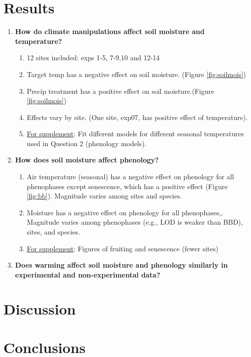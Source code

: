 \documentclass{article}
\begin{document}
\section* {Results}
\begin{singlespace}

\begin{enumerate}
\item {\textbf{How do climate manipulations affect soil moisture and temperature?}}
\begin{enumerate}
\item{12 sites included: exps 1-5, 7-9,10 and 12-14}
\item{Target temp has a negative effect on soil moisture. (Figure \ref {fig:soilmois})}
\item{Precip treatment has a positive effect on soil moisture.(Figure \ref {fig:soilmois})}
\item{Effects vary by site. (One site, exp07, has positive effect of temperature).}
\item \underline{For supplement}: Fit different models for different seasonal temperatures used in Question 2 (phenology models).
\end{enumerate}

\item{\textbf{How does soil moisture affect phenology?
}}
\begin{enumerate}
\item Air temperature (seasonal) has a negative effect on phenology for all phenophases except senescence, which has a positive effect (Figure \ref{fig:bb}). Magnitude varies among sites and species. 
\item Moisture has a negative effect on phenology for all phenophases,. Magnitude varies among phenophases (e.g., LOD is weaker than BBD), sites, and species.
\item \underline{For supplement}: Figures of fruiting and senescence (fewer sites)
\end{enumerate}
\item {\textbf{Does warming affect soil moisture and phenology similarly in experimental and non-experimental data?}}
\end{enumerate}
\end{singlespace}

\section* {Discussion}

\section* {Conclusions}
\end{document}
